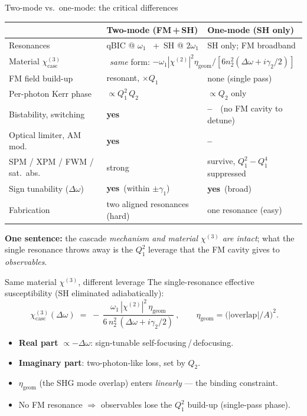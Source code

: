 \documentclass[aspectratio=169,11pt]{beamer}
\newcommand{\chitwo}{\chi^{(2)}}
\newcommand{\chithree}{\chi^{(3)}}
\newcommand{\chicasc}{\chi^{(3)}_{\mathrm{casc}}}
\newcommand{\Dom}{\Delta\omega}
\newcommand{\gtwo}{\gamma_2}
\newcommand{\yes}{\textcolor{good}{\textbf{yes}}}
\newcommand{\no}{\textcolor{bad}{\textbf{--}}}
\begin{document}
\begin{frame}{Two-mode vs.\ one-mode: the critical differences}
  \scriptsize
  \begin{table}
  \begin{tabular}{@{}lll@{}}
    \toprule
     & \textbf{Two-mode} (FM\,+\,SH) & \textbf{One-mode} (SH only) \\
    \midrule
    Resonances            & qBIC @ $\omega_1$ \ +\ SH @ $2\omega_1$ & SH only; FM broadband \\
    Material $\chicasc$    & \multicolumn{2}{c}{\emph{same} form: $-\omega_1|\chitwo|^2\eta_{\mathrm{geom}}/[6n_2^2(\Dom+i\gtwo/2)]$} \\
    FM field build-up     & resonant, $\times Q_1$                  & none (single pass) \\
    Per-photon Kerr phase & $\propto Q_1^{2}\,Q_2$                   & $\propto Q_2$ only \\[2pt]
    Bistability, switching   & \yes                                 & \no\ \ (no FM cavity to detune) \\
    Optical limiter, AM mod. & \yes                                 & \no \\
    SPM / XPM / FWM / sat.\ abs. & strong                          & survive, $Q_1^{2}\!-\!Q_1^{4}$ suppressed \\
    Sign tunability ($\Dom$) & \yes\ (within $\pm\gamma_1$)         & \yes\ (broad) \\
    Fabrication           & two aligned resonances (hard)           & one resonance (easy) \\
    \bottomrule
  \end{tabular}
  \end{table}
  \normalsize
  \vspace{2pt}
  \textbf{One sentence:} the cascade \emph{mechanism and material $\chithree$ are
  intact}; what the single resonance throws away is the $Q_1^{2}$ leverage that the
  FM cavity gives to \emph{observables}.
\end{frame}

\begin{frame}{Same material $\chithree$, different leverage}
  The single-resonance effective susceptibility (SH eliminated adiabatically):
  \[
    \boxed{\ \chicasc(\Dom)\;=\;-\,\frac{\omega_1\,|\chitwo|^{2}\,
            \eta_{\mathrm{geom}}}{6\,n_2^{2}\,(\Dom+i\gtwo/2)}\ },
    \qquad
    \eta_{\mathrm{geom}}=\bigl(|\mathrm{overlap}|/A\bigr)^{2}.
  \]
  \begin{itemize}
    \item \textbf{Real part} $\propto -\Dom$: sign-tunable self-focusing\,/\,defocusing.
    \item \textbf{Imaginary part}: two-photon-like loss, set by $Q_2$.
    \item $\eta_{\mathrm{geom}}$ (the SHG mode overlap) enters \emph{linearly} --- the binding constraint.
    \item No FM resonance $\Rightarrow$ observables lose the $Q_1^{2}$ build-up (single-pass phase).
  \end{itemize}
\end{frame}
\end{document}
